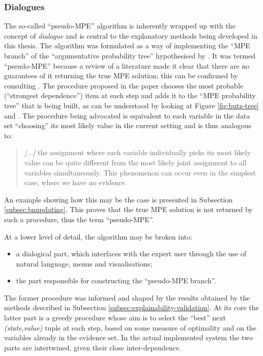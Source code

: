 \subsubsection{Dialogues} \label{subsubsec:dialogues}
The so-called \enquote{pseudo-MPE} algorithm is inherently wrapped up with the concept of \textit{dialogue} and is central to the explanatory methods being developed in this thesis.
The algorithm was formulated as a way of implementing the \enquote{MPE branch} of the \enquote{argumentative probability tree} hypothesised by \citet{Butz2018}.
It was termed \enquote{pseudo-MPE} because a review of a literature made it clear that there are no guarantees of it returning the true MPE solution; this can be confirmed by consulting \citep[pag. 26]{koller2007}.
The procedure proposed in the paper chooses the most probable (\enquote{strongest dependence}) item at each step and adds it to the \enquote{MPE probability tree} that is being built, as can be understood by looking at Figure \ref{fig:butz-tree} and \citep[sec. 3.1 and 4.3]{Butz2018}.
The procedure being advocated is equivalent to each variable in the data set \enquote{choosing} its most likely value in the current setting and is thus analogous to:
\begin{quotation}
	\textit{[...]} the assignment where each variable individually picks its most likely value can be quite different from the most likely joint assignment to all variables simultaneously. This phenomenon can occur even in the simplest case, where we have no evidence.
	
	\hfill \citep[pag. 26]{koller2007}
\end{quotation}
An example showing how this may be the case is presented in Subsection \ref{subsec:bnupdating}.
This proves that the true MPE solution is not returned by such a procedure, thus the term \enquote{pseudo-MPE}.

At a lower level of detail, the algorithm may be broken into:
\begin{itemize}
	\item a dialogical part, which interfaces with the expert user through the use of natural language, menus and visualisations;
	\item the part responsible for constructing the \enquote{pseudo-MPE branch}.
\end{itemize}
The former procedure was informed and shaped by the results obtained by the methods described in Subsection \ref{subsec:explainability-validation}.
At its core the latter part is a greedy procedure whose aim is to select the \enquote{best} next \textit{(state,value)} tuple at each step, based on some measure of optimality and on the variables already in the evidence set.
In the actual implemented system the two parts are intertwined, given their close inter-dependence.

